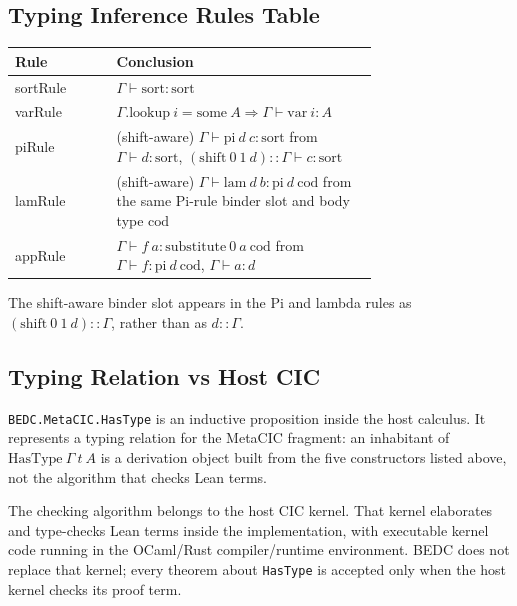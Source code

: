 \subsection{Typing Inference Rules Table}\label{subsec:reconstruction-typing-rules-table}

\begin{center}
\begin{tabular}{l p{0.72\linewidth}}
\hline
Rule & Conclusion \\
\hline
sortRule & $\Gamma \vdash \mathrm{sort} : \mathrm{sort}$ \\
varRule & $\Gamma.\mathrm{lookup}\ i = \mathrm{some}\ A \Rightarrow \Gamma \vdash \mathrm{var}\ i : A$ \\
piRule & (shift-aware) $\Gamma \vdash \mathrm{pi}\ d\ c : \mathrm{sort}$ from $\Gamma \vdash d : \mathrm{sort}$, $(\mathrm{shift}\ 0\ 1\ d) :: \Gamma \vdash c : \mathrm{sort}$ \\
lamRule & (shift-aware) $\Gamma \vdash \mathrm{lam}\ d\ b : \mathrm{pi}\ d\ \mathrm{cod}$ from the same Pi-rule binder slot and body type $\mathrm{cod}$ \\
appRule & $\Gamma \vdash f\ a : \mathrm{substitute}\ 0\ a\ \mathrm{cod}$ from $\Gamma \vdash f : \mathrm{pi}\ d\ \mathrm{cod}$, $\Gamma \vdash a : d$ \\
\hline
\end{tabular}
\end{center}

The shift-aware binder slot appears in the Pi and lambda rules as
$(\mathrm{shift}\ 0\ 1\ d) :: \Gamma$, rather than as $d :: \Gamma$.

\subsection{Typing Relation vs Host CIC}\label{subsec:reconstruction-typing-vs-host}

\texttt{BEDC.MetaCIC.HasType} is an inductive proposition inside the host
calculus. It represents a typing relation for the MetaCIC fragment: an
inhabitant of $\mathrm{HasType}\ \Gamma\ t\ A$ is a derivation object built
from the five constructors listed above, not the algorithm that checks Lean
terms.

The checking algorithm belongs to the host CIC kernel. That kernel elaborates
and type-checks Lean terms inside the implementation, with executable kernel
code running in the OCaml/Rust compiler/runtime environment. BEDC does not
replace that kernel; every theorem about \texttt{HasType} is accepted only
when the host kernel checks its proof term.

